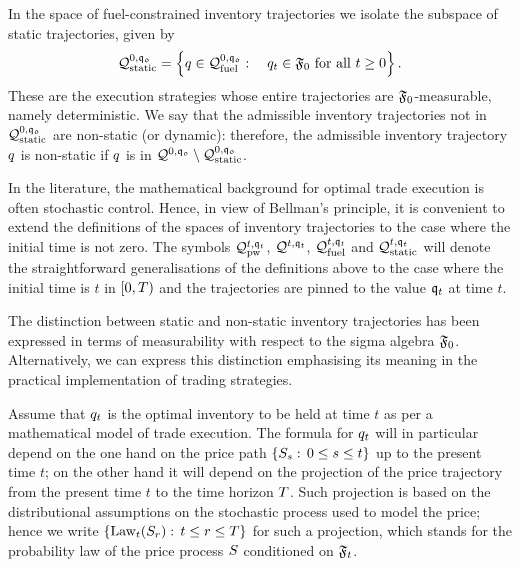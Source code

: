 \documentclass[10pt,a4paper]{article}
\begin{document}
In the space of fuel-constrained inventory trajectories we isolate the subspace of static trajectories, given by
\begin{equation*}
\mathcal{Q}_{\text{static}}^{0,\mathfrak{q_0}} = 
\left\lbrace q \in \mathcal{Q}_{\text{fuel}}^{0,\mathfrak{q_0}}: \quad 
q_t \in \mathfrak{F}_0 \text{ for all } t \geq 0 \right\rbrace.
\end{equation*}
These are the execution strategies whose entire trajectories are $\mathfrak{F}_0$-measurable, namely deterministic. We say that the admissible inventory trajectories not in $	\mathcal{Q}_{\text{static}}^{0,\mathfrak{q_0}}$ are non-static (or dynamic): therefore, the admissible inventory trajectory $q$ is non-static if $q$ is in  $\mathcal{Q}^{0,\mathfrak{q_0}}\setminus \mathcal{Q}_{\text{static}}^{0,\mathfrak{q_0}}$.

In the literature, the mathematical background for optimal trade execution is often stochastic control. Hence, in view of Bellman's principle, it is convenient to extend the definitions of the spaces of inventory trajectories to the case where the initial time is not zero. The symbols $\mathcal{Q}_{\text{pw}}^{t,\mathfrak{q}_t}$, $\mathcal{Q}^{t,\mathfrak{q}_t}$, $\mathcal{Q}_{\text{fuel}}^{t,\mathfrak{q}_t}$ and $\mathcal{Q}_{\text{static}}^{t,\mathfrak{q}_t}$ will denote the straightforward generalisations of the definitions above to the case where the initial time is $t$ in $[0,T)$ and the trajectories are pinned to the value $\mathfrak{q}_t$ at time $t$. 

The distinction between static and non-static inventory trajectories has been expressed in terms of measurability with respect to the sigma algebra $\mathfrak{F}_0$. Alternatively, we can express this distinction emphasising its meaning in the practical implementation of trading strategies. 

Assume that $q_t$ is the optimal inventory to be held at time $t$ as per a mathematical model of trade execution. The formula for $q_t$ will in particular depend on the one hand on the price path $\lbrace S_s:\, 0\leq s\leq t\rbrace$ up to the present time $t$;  on the other hand it will depend on the projection of the price trajectory from the present time $t$ to the time horizon $T$. Such projection is based on the distributional assumptions on the stochastic process used to model the price; hence we write 
$\lbrace \text{Law}_t (S_r): \, t\leq r\leq T\rbrace$ for such a projection, which stands for the probability law of the price process $S$ conditioned on $\mathfrak{F}_t$. 
\end{document}
